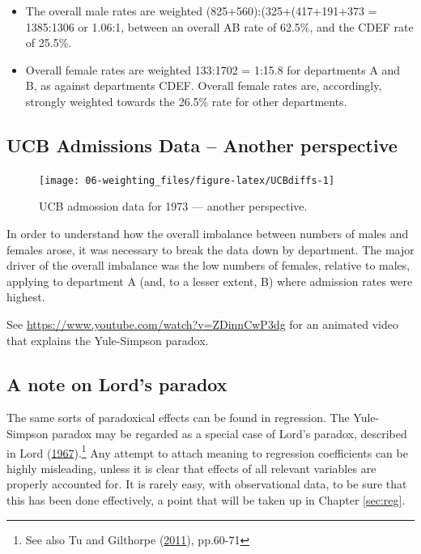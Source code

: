 \documentclass[
  10pt,
  b5paper]{book}
\providecommand{\tightlist}{%
  \setlength{\itemsep}{0pt}\setlength{\parskip}{0pt}}
\begin{document}
\begin{itemize}
\tightlist
\item
  The overall male rates are weighted (825+560):(325+(417+191+373 = 1385:1306 or 1.06:1, between an overall AB rate of 62.5\%, and the CDEF rate of 25.5\%.\\
\item
  Overall female rates are weighted 133:1702 = 1:15.8 for departments A and B, as against departments CDEF. Overall female rates are, accordingly, strongly weighted towards the 26.5\% rate for other departments.
\end{itemize}

\hypertarget{ucb-admissions-data-another-perspective}{%
\subsection*{UCB Admissions Data -- Another perspective}\label{ucb-admissions-data-another-perspective}}

\begin{figure}[H]

{\centering \texttt{[image: 06-weighting\_files/figure-latex/UCBdiffs-1]} 

}

\caption{UCB admossion data for 1973 --- another perspective.}\label{fig:UCBdiffs}
\end{figure}

In order to understand how the overall imbalance between numbers of males and females arose, it was necessary to break the data down by department. The major driver of the overall imbalance was the low numbers of females, relative to males, applying to department A (and, to a lesser extent, B) where admission rates were highest.

See \url{https://www.youtube.com/watch?v=ZDinnCwP3dg} for an animated video that explains the Yule-Simpson paradox.

\hypertarget{a-note-on-lords-paradox}{%
\subsection*{A note on Lord's paradox}\label{a-note-on-lords-paradox}}

The same sorts of paradoxical effects can be found in regression. The Yule-Simpson paradox may be regarded as a special case of Lord's paradox, described in Lord (\protect\hyperlink{ref-lord1967paradox}{1967}).\footnote{See also Tu and Gilthorpe (\protect\hyperlink{ref-tu2011statistical}{2011}), pp.60-71} Any attempt to attach meaning to regression coefficients can be highly misleading, unless it is clear that effects of all relevant variables are properly accounted for. It is rarely easy, with observational data, to be sure that this has been done effectively, a point that will be taken up in Chapter \ref{sec:reg}.
\end{document}

